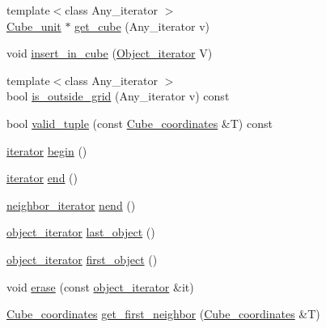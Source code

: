 \begin{DoxyCompactItemize}
{\footnotesize template$<$class Any\+\_\+iterator $>$ }\\\hyperlink{structESBTL_1_1Grid__of__cubes_1_1Cube__unit}{Cube\+\_\+unit} $\ast$ \hyperlink{structESBTL_1_1Grid__of__cubes_a0af6b76850ef42d6b6ac984a778ad488}{get\+\_\+cube} (Any\+\_\+iterator v)
\item 
void \hyperlink{structESBTL_1_1Grid__of__cubes_a118fc01496c0106e4c3e8fb34c0e6b96}{insert\+\_\+in\+\_\+cube} (\hyperlink{structESBTL_1_1Grid__of__cubes_ae77665f05d6c7ae05c3d2d764df99193}{Object\+\_\+iterator} V)
\item 
{\footnotesize template$<$class Any\+\_\+iterator $>$ }\\bool \hyperlink{structESBTL_1_1Grid__of__cubes_a4879cc0da2c1c552494ca1a938639ef3}{is\+\_\+outside\+\_\+grid} (Any\+\_\+iterator v) const
\item 
bool \hyperlink{structESBTL_1_1Grid__of__cubes_a82f6018d7f00397ff9cc8a4fadec3d9e}{valid\+\_\+tuple} (const \hyperlink{structESBTL_1_1Grid__of__cubes_ad55c84346bab961e08d95e494551d07d}{Cube\+\_\+coordinates} \&T) const
\item 
\hyperlink{classESBTL_1_1Grid__of__cubes_1_1iterator}{iterator} \hyperlink{structESBTL_1_1Grid__of__cubes_a24b1d4f577217fe038edf83e4f71d386}{begin} ()
\item 
\hyperlink{classESBTL_1_1Grid__of__cubes_1_1iterator}{iterator} \hyperlink{structESBTL_1_1Grid__of__cubes_a9219cdd27261e9c9e95296c46df5067d}{end} ()
\item 
\hyperlink{classESBTL_1_1Grid__of__cubes_1_1neighbor__iterator}{neighbor\+\_\+iterator} \hyperlink{structESBTL_1_1Grid__of__cubes_a80598e81cc5bfeccaf8650978cf11f19}{nend} ()
\item 
\hyperlink{classESBTL_1_1Grid__of__cubes_1_1object__iterator}{object\+\_\+iterator} \hyperlink{structESBTL_1_1Grid__of__cubes_a2dc3c394266da4c2416d96ec7a27678c}{last\+\_\+object} ()
\item 
\hyperlink{classESBTL_1_1Grid__of__cubes_1_1object__iterator}{object\+\_\+iterator} \hyperlink{structESBTL_1_1Grid__of__cubes_aadc2357c0255f0dc412d754755f8b3a9}{first\+\_\+object} ()
\item 
void \hyperlink{structESBTL_1_1Grid__of__cubes_a43799f2fa1eacebe1fc213450c2d8e1c}{erase} (const \hyperlink{classESBTL_1_1Grid__of__cubes_1_1object__iterator}{object\+\_\+iterator} \&it)
\item 
\hyperlink{structESBTL_1_1Grid__of__cubes_ad55c84346bab961e08d95e494551d07d}{Cube\+\_\+coordinates} \hyperlink{structESBTL_1_1Grid__of__cubes_aee9c04e5770082fe01a7badda0833bca}{get\+\_\+first\+\_\+neighbor} (\hyperlink{structESBTL_1_1Grid__of__cubes_ad55c84346bab961e08d95e494551d07d}{Cube\+\_\+coordinates} \&T)

\end{DoxyCompactItemize}
